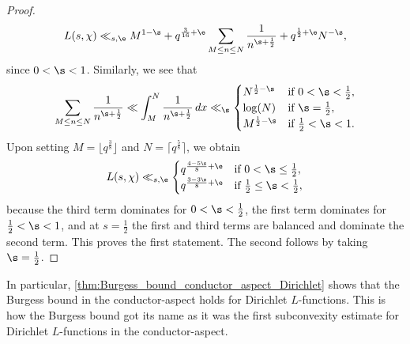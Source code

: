 \begin{proof}
      \[
        L(s,\chi) \ll_{s,\e} M^{1-\s}+q^{\frac{3}{16}+\e}\sum_{M \le n \le N}\frac{1}{n^{\s+\frac{1}{2}}}+q^{\frac{1}{2}+\e}N^{-\s},
      \]
      since \(0 < \s < 1\). Similarly, we see that
      \[
        \sum_{M \le n \le N}\frac{1}{n^{\s+\frac{1}{2}}} \ll \int_{M}^{N}\frac{1}{n^{\s+\frac{1}{2}}}\,dx \ll_{\s} \begin{cases} N^{\frac{1}{2}-\s} & \text{if \(0 < \s < \frac{1}{2}\)}, \\ \log(N) & \text{if \(\s = \frac{1}{2}\)}, \\ M^{\frac{1}{2}-\s} & \text{if \(\frac{1}{2} < \s < 1\)}. \end{cases}
      \]
       Upon setting \(M = \lfloor q^{\frac{3}{8}} \rfloor\) and \(N = \lceil q^{\frac{5}{8}} \rceil\), we obtain
      \[
        L(s,\chi) \ll_{s,\e} \begin{cases} q^{\frac{4-5\s}{8}+\e} & \text{if \(0 < \s \le \frac{1}{2}\)}, \\ q^{\frac{3-3\s}{8}+\e} & \text{if \(\frac{1}{2} \le \s < \frac{1}{2}\)}, \end{cases}
      \]
      because the third term dominates for \(0 < \s < \frac{1}{2}\), the first term dominates for \(\frac{1}{2} < \s < 1\), and at \(s = \frac{1}{2}\) the first and third terms are balanced and dominate the second term. This proves the first statement. The second follows by taking \(\s = \frac{1}{2}\).
    \end{proof}

    In particular, \cref{thm:Burgess_bound_conductor_aspect_Dirichlet} shows that the Burgess bound in the conductor-aspect holds for Dirichlet \(L\)-functions. This is how the Burgess bound got its name as it was the first subconvexity estimate for Dirichlet \(L\)-functions in the conductor-aspect.
